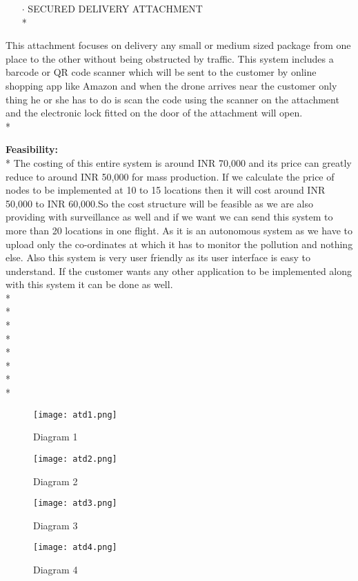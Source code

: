 \documentclass[12pt]{article}
\begin{document}
\begin{itemize}
\item[$\cdot$] SECURED DELIVERY ATTACHMENT \\*
\end{itemize}
This attachment focuses on delivery any small or medium sized package from one place to the other without being obstructed by traffic. This system includes a barcode or QR code scanner which will be sent to the customer by online shopping app like Amazon and when the drone arrives near the customer only thing he or she has to do is scan the code using the scanner on the attachment and the electronic lock fitted on the door of the attachment will open.\\*

\textbf{Feasibility:} \\*
The costing of this entire system is around INR 70,000 and its price can greatly reduce to around INR 50,000 for mass production. If we calculate the price of nodes to be implemented at 10 to 15 locations then it will cost around INR 50,000 to INR 60,000.So the cost structure will be feasible as we are also providing with surveillance as well and if we want we can send this system to more than 20 locations in one flight. As it is an autonomous system as we have to upload only the co-ordinates at which it has to monitor the pollution and nothing else. Also this system is very user friendly as its user interface is easy to understand. If the customer wants any other application to be implemented along with this system it can be done as well. \\* \\* \\* \\* \\* \\* \\* \\*






\begin{figure}
	\centering
	\texttt{[image: atd1.png]}
	\caption{ Diagram 1} 
	\texttt{[image: atd2.png]}
	\caption{ Diagram 2} 


	\label{image_1} %
	\label{image_2} %

\end{figure}

\begin{figure}
	\centering
	\texttt{[image: atd3.png]}
	\caption{ Diagram 3} 
\texttt{[image: atd4.png]}
\caption{ Diagram 4} 

	\label{image_3} %
\label{image_4} %

\end{figure}
\end{document}
